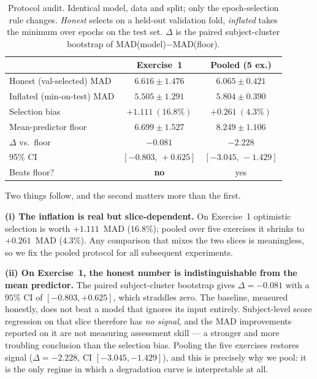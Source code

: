 \begin{table}[!t]
\centering
\caption{Protocol audit. Identical model, data and split; only the epoch-selection rule changes.
\emph{Honest} selects on a held-out validation fold, \emph{inflated} takes the minimum over epochs
on the test set. $\Delta$ is the paired subject-cluster bootstrap of MAD(model)$-$MAD(floor).}
\label{tab:protocol}
\footnotesize
\setlength{\tabcolsep}{4pt}
\begin{tabular}{lcc}
\toprule
 & Exercise~1 & Pooled (5 ex.) \\
\midrule
Honest (val-selected) MAD   & $6.616 \pm 1.476$ & $6.065 \pm 0.421$ \\
Inflated (min-on-test) MAD  & $5.505 \pm 1.291$ & $5.804 \pm 0.390$ \\
Selection bias              & $+1.111\ (16.8\%)$ & $+0.261\ (4.3\%)$ \\
\midrule
Mean-predictor floor        & $6.699 \pm 1.527$ & $8.249 \pm 1.106$ \\
$\Delta$ vs.\ floor         & $-0.081$ & $-2.228$ \\
95\% CI                     & $[-0.803,\, +0.625]$ & $[-3.045,\, -1.429]$ \\
Beats floor?                & \textbf{no} & yes \\
\bottomrule
\end{tabular}
\end{table}

Two things follow, and the second matters more than the first.

\textbf{(i) The inflation is real but slice-dependent.} On Exercise~1 optimistic selection is worth
$+1.111$~MAD ($16.8\%$); pooled over five exercises it shrinks to $+0.261$~MAD ($4.3\%$). Any
comparison that mixes the two slices is meaningless, so we fix the pooled protocol for all
subsequent experiments.

\textbf{(ii) On Exercise~1, the honest number is indistinguishable from the mean predictor.} The
paired subject-cluster bootstrap gives $\Delta=-0.081$ with a $95\%$ CI of $[-0.803,+0.625]$, which
straddles zero. The baseline, measured honestly, does not beat a model that ignores its input
entirely. Subject-level score regression on that slice therefore has \emph{no signal}, and the MAD
improvements reported on it are not measuring assessment skill --- a stronger and more troubling
conclusion than the selection bias. Pooling the five exercises restores signal
($\Delta=-2.228$, CI $[-3.045,-1.429]$), and this is precisely why we pool: it is the only regime
in which a degradation curve is interpretable at all.

